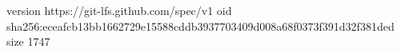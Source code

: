 version https://git-lfs.github.com/spec/v1
oid sha256:eceafcb13bb1662729e15588cddb3937703409d008a68f0373f391d32f381ded
size 1747
